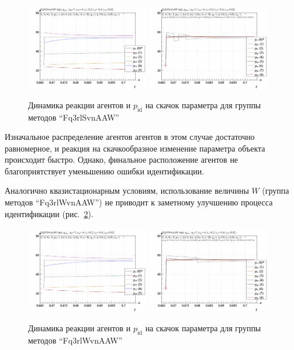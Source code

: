 \begin{figure}[htb!]
  \centerline{
    \includegraphics[width=0.48\textwidth]{p/sign/qls-p_t_pi_m_Fq3rlSvnAAW_sign.png}
    \hfill
    \includegraphics[width=0.48\textwidth]{p/sign/qls-p_t_p_m_Fq3rlSvnAAW_sign.png}
  }
  \caption{Динамика реакции агентов и $p_\mathrm{id}$ на скачок параметра для группы методов ``Fq3rlSvnAAW''}
  \label{atu:f:Fq3rlSvnAAW_sign}
\end{figure}

Изначальное распределение агентов агентов в этом случае достаточно равномерное,
и реакция на скачкообразное изменение параметра объекта
происходит быстро. Однако, финальное расположение агентов
не благоприятствует уменьшению ошибки идентификации.

Аналогично квазистационарным условиям,
использование величины $W$ (группа методов ``Fq3rlWvnAAW'')
не приводит к заметному улучшению процесса идентификации
(рис.~\ref{atu:f:Fq3rlWvnAAW_sign}).

\begin{figure}[htb!]
  \centerline{
    \includegraphics[width=0.48\textwidth]{p/sign/qls-p_t_pi_m_Fq3rlWvnAAW_sign.png}
    \hfill
    \includegraphics[width=0.48\textwidth]{p/sign/qls-p_t_p_m_Fq3rlWvnAAW_sign.png}
  }
  \caption{Динамика реакции агентов и $p_\mathrm{id}$ на скачок параметра для группы методов ``Fq3rlWvnAAW''}
  \label{atu:f:Fq3rlWvnAAW_sign}
\end{figure}

